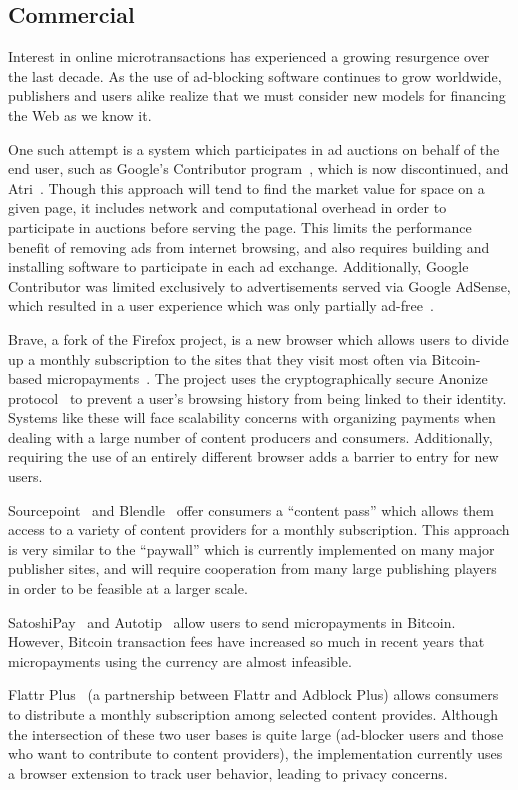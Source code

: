 \subsection{Commercial}
Interest in online microtransactions has experienced a growing resurgence over the last decade.
As the use of ad-blocking software continues to grow worldwide, publishers and users alike realize that we must consider new models for financing the Web as we know it.

One such attempt is a system which participates in ad auctions on behalf of the end user, such as Google's Contributor program~\cite{contributor}, which is now discontinued, and Atri~\cite{atri}.
Though this approach will tend to find the market value for space on a given page, it includes network and computational overhead in order to participate in auctions before serving the page.
This limits the performance benefit of removing ads from internet browsing, and also requires building and installing software to participate in each ad exchange.
Additionally, Google Contributor was limited exclusively to advertisements served via Google AdSense, which resulted in a user experience which was only partially ad-free~\cite{adsense}.

Brave, a fork of the Firefox project, is a new browser which allows users to divide up a monthly subscription to the sites that they visit most often via Bitcoin-based micropayments~\cite{brave}.
The project uses the cryptographically secure Anonize protocol~\cite{anonize} to prevent a user's browsing history from being linked to their identity.
Systems like these will face scalability concerns with organizing payments when dealing with a large number of content producers and consumers.
Additionally, requiring the use of an entirely different browser adds a barrier to entry for new users.

Sourcepoint~\cite{sourcepoint} and Blendle~\cite{blendle} offer consumers a “content pass” which allows them access to a variety of content providers for a monthly subscription.
This approach is very similar to the ``paywall'' which is currently implemented on many major publisher sites, and will require cooperation from many large publishing players in order to be feasible at a larger scale.

SatoshiPay~\cite{satoshi} and Autotip~\cite{autotip} allow users to send micropayments in Bitcoin.
However, Bitcoin transaction fees have increased so much in recent years that micropayments using the currency are almost infeasible.

Flattr Plus~\cite{flattrplus} (a partnership between Flattr and Adblock Plus) allows consumers to distribute a monthly subscription among selected content provides.
Although the intersection of these two user bases is quite large (ad-blocker users and those who want to contribute to content providers), the implementation currently uses a browser extension to track user behavior, leading to privacy concerns.